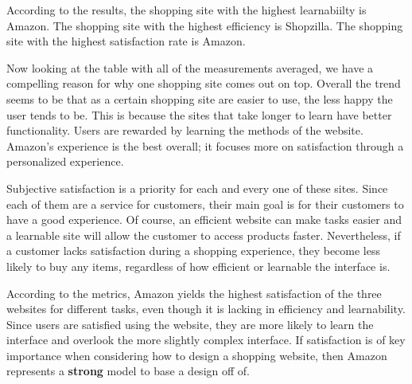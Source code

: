 \documentclass[11pt, oneside]{article}   	%
\begin{document}
According to the results, the shopping site with the highest learnabiilty is Amazon. The shopping site with the highest efficiency is Shopzilla. The shopping site with the highest satisfaction rate is Amazon.


Now looking at the table with all of the measurements averaged, we have a compelling reason for why one shopping site comes out on top. Overall the trend seems to be that as a certain shopping site are easier to use, the less happy the user tends to be. This is because the sites that take longer to learn have better functionality. Users are rewarded by learning the methods of the website. Amazon's experience is the best overall; it focuses more on satisfaction through a personalized experience.

Subjective satisfaction is a priority for each and every one of these sites. Since each of them are a service for customers, their main goal is for their customers to have a good experience. Of course, an efficient website can make  tasks easier and a learnable site will allow the customer to access products faster. Nevertheless, if a customer lacks satisfaction during a shopping experience, they become less likely to buy any items, regardless of how efficient or learnable the interface is. 

According to the metrics, Amazon yields the highest satisfaction of the three websites for different tasks, even though it is lacking in efficiency and learnability. Since users are satisfied using the website, they are more likely to learn the interface and overlook the more slightly complex interface. If satisfaction is of key importance when considering how to design a shopping website, then Amazon represents a \textbf{strong} model to base a design off of.

%
\end{document}
